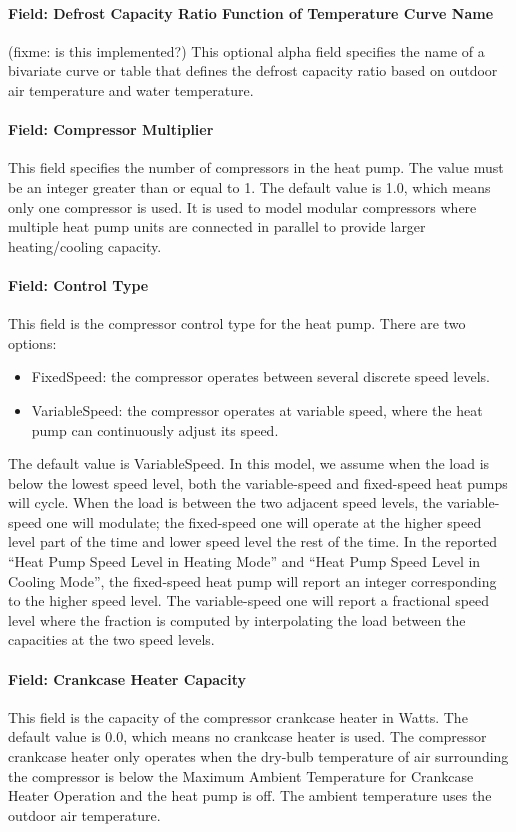 \paragraph{Field: Defrost Capacity Ratio Function of Temperature Curve Name}
(fixme: is this implemented?) This optional alpha field specifies the name of a
bivariate curve or table that defines the defrost capacity ratio based on
outdoor air temperature and water temperature.
\paragraph{Field: Compressor Multiplier} This field specifies the number of
compressors in the heat pump. The value must be an integer greater than or equal
to 1. The default value is 1.0, which means only one compressor is used. It is
used to model modular compressors where multiple heat pump units are connected
in parallel to provide larger heating/cooling capacity.
\paragraph{Field: Control Type} This field is the compressor control type for
the heat pump. There are two options:

\begin{itemize}
\item FixedSpeed: the compressor operates between several discrete speed levels.
\item VariableSpeed: the compressor operates at variable speed, where the heat
  pump can continuously adjust its speed.
\end{itemize}
The default value is VariableSpeed. In this model, we assume when the load is
below the lowest speed level, both the variable-speed and fixed-speed heat pumps
will cycle. When the load is between the two adjacent speed levels, the
variable-speed one will modulate; the fixed-speed one will operate at the higher
speed level part of the time and lower speed level the rest of the time. In the
reported ``Heat Pump Speed Level in Heating Mode'' and ``Heat Pump Speed Level
in Cooling Mode'', the fixed-speed heat pump will report an integer corresponding to
the higher speed level. The variable-speed one will report a fractional speed
level where the fraction is computed by interpolating the load between the capacities 
at the two speed levels.
\paragraph{Field: Crankcase Heater Capacity} This field is the capacity of the
compressor crankcase heater in Watts. The default value is 0.0, which means no
crankcase heater is used. The compressor crankcase heater only operates when the
dry-bulb temperature of air surrounding the compressor is below the Maximum
Ambient Temperature for Crankcase Heater Operation and the heat pump is off. The
ambient temperature uses the outdoor air temperature.
